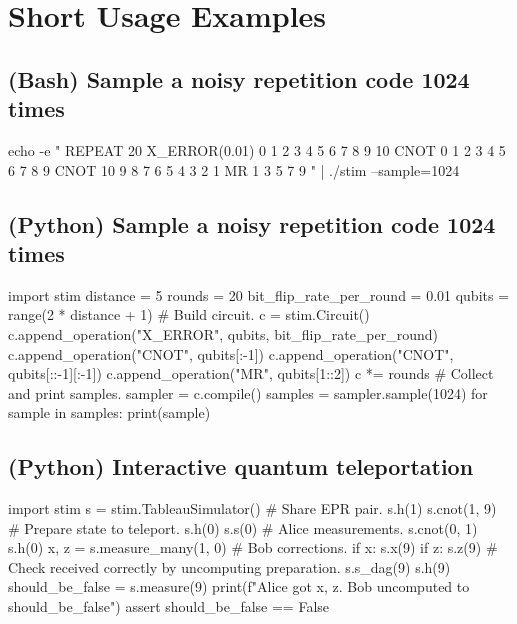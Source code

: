 \documentclass[onecolumn,unpublished]{quantumarticle}
\theoremstyle{definition}
\theoremstyle{definition}
\theoremstyle{definition}
\begin{document}
\section{Short Usage Examples}
\label{sec:example}

\subsection{(Bash) Sample a noisy repetition code 1024 times}

\begin{python}
    echo -e "
        REPEAT 20 {\n
            X_ERROR(0.01) 0 1 2 3 4 5 6 7 8 9 10\n
            CNOT 0 1 2 3 4 5 6 7 8 9\n
            CNOT 10 9 8 7 6 5 4 3 2 1\n
            MR 1 3 5 7 9\n
        }
    " | ./stim --sample=1024
\end{python}

\subsection{(Python) Sample a noisy repetition code 1024 times}

\begin{python}
    import stim
    distance = 5
    rounds = 20
    bit_flip_rate_per_round = 0.01
    qubits = range(2 * distance + 1)
    # Build circuit.
    c = stim.Circuit()
    c.append_operation("X_ERROR", qubits, bit_flip_rate_per_round)
    c.append_operation("CNOT", qubits[:-1])
    c.append_operation("CNOT", qubits[::-1][:-1])
    c.append_operation("MR", qubits[1::2])
    c *= rounds
    # Collect and print samples.
    sampler = c.compile()
    samples = sampler.sample(1024)
    for sample in samples: print(sample)
\end{python}

\subsection{(Python) Interactive quantum teleportation}

\begin{python}
    import stim
    s = stim.TableauSimulator()
    # Share EPR pair.
    s.h(1)
    s.cnot(1, 9)
    # Prepare state to teleport.
    s.h(0)
    s.s(0)
    # Alice measurements.
    s.cnot(0, 1)
    s.h(0)
    x, z = s.measure_many(1, 0)
    # Bob corrections.
    if x: s.x(9)
    if z: s.z(9)
    # Check received correctly by uncomputing preparation.
    s.s_dag(9)
    s.h(9)
    should_be_false = s.measure(9)
    print(f"Alice got {x}, {z}. Bob uncomputed to {should_be_false}")
    assert should_be_false == False
\end{python}
\end{document}
